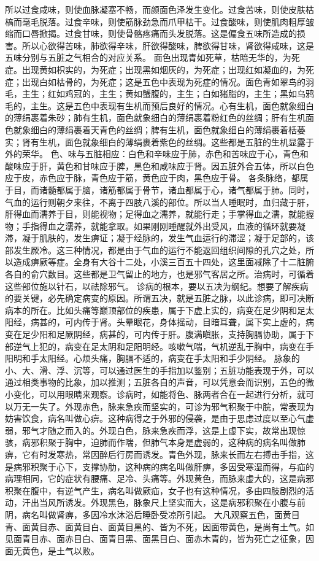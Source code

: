 \documentclass[a4paper,12pt,UTF8,twoside]{ctexbook}
\begin{document}
所以过食咸味，则使血脉凝塞不畅，而颜面色泽发生变化。过食苦味，则使皮肤枯槁而毫毛脱落。过食辛味，则使筋脉劲急而爪甲枯干。过食酸味，则使肌肉粗厚皱缩而口唇掀揭。过食甘味，则使骨骼疼痛而头发脱落。这是偏食五味所造成的损害。所以心欲得苦味，肺欲得辛味，肝欲得酸味，脾欲得甘味，肾欲得咸味，这是五味分别与五脏之气相合的对应关系。
面色出现青如死草，枯暗无华的，为死症。出现黄如枳实的，为死症；出现黑如烟灰的，为死症；出现红如凝血的，为死症；出现白如枯骨的，为死症；这是五色中表现为死症的情况。面色青如翠鸟的羽毛，主生；红如鸡冠的，主生；黄如蟹腹的，主生；白如猪脂的，主生；黑如乌鸦毛的，主生。这是五色中表现有生机而预后良好的情况。心有生机，面色就象细白的薄绢裹着朱砂；肺有生机，面色就象细白的薄绢裹着粉红色的丝绸；肝有生机面色就象细白的薄绢裹着天青色的丝绸；脾有生机，面色就象细白的薄绢裹着栝蒌实；肾有生机，面色就象细白的薄绢裹着紫色的丝绸。这些都是五脏的生机显露于外的荣华。
色、味与五脏相应：白色和辛味应于肺，赤色和苦味应于心，青色和酸味应于肝，黄色和甘味应于脾，黑色和咸味应于肾。因五脏外合五体，所以白色应于皮，赤色应于脉，青色应于筋，黄色应于肉，黑色应于骨。
各条脉络，都属于目，而诸髓都属于脑，诸筋都属于骨节，诸血都属于心，诸气都属于肺。同时，气血的运行则朝夕来往，不离于四肢八溪的部位。所以当人睡眠时，血归藏于肝，肝得血而濡养于目，则能视物；足得血之濡养，就能行走；手掌得血之濡，就能握物；手指得血之濡养，就能拿取。如果刚刚睡醒就外出受风，血液的循环就要凝滞，凝于肌肤的，发生痹证；凝于经脉的，发生气血运行的滞涩；凝于足部的，该部发生厥冷。这三种情况，都是由于气血的运行不能返回组织间隙的孔穴之处，所以造成痹厥等症。全身有大谷十二处，小溪三百五十四处，这里面减除了十二脏腑各自的俞穴数目。这些都是卫气留止的地方，也是邪气客居之所。治病时，可循着这些部位施以针石，以祛除邪气。
诊病的根本，要以五决为纲纪。想要了解疾病的要关键，必先确定病变的原因。所谓五决，就是五脏之脉，以此诊病，即可决断病本的所在。比如头痛等巅顶部位的疾患，属于下虚上实的，病变在足少阴和足太阳经，病甚的，可内传于肾。头晕眼花，身体摇动，目暗耳聋，属下实上虚的，病变在足少阳和足厥阴经，病甚的，可内传于肝。腹满瞋胀，支持胸膈协助，属于下部逆气上犯的，病变在足太阴和足阳明经。咳嗽气喘，气机逆乱于胸中，病变在手阳明和手太阳经。心烦头痛，胸膈不适的，病变在手太阳和手少阴经。
脉象的小、大、滑、浮、沉等，可以通过医生的手指加以鉴别；五脏功能表现于外，可以通过相类事物的比象，加以推测；五脏各自的声音，可以凭意会而识别，五色的微小变化，可以用眼睛来观察。诊病时，如能将色、脉两者合在一起进行分析，就可以万无一失了。外现赤色，脉来急疾而坚实的，可诊为邪气积聚于中脘，常表现为妨害饮食，病名叫做心痹。这种病得之于外邪的侵袭，是由于思虑过度以至心气虚弱，邪气才随之而入的。外现白色，脉来急疾而浮，这是上虚下实，故常出现惊骇，病邪积聚于胸中，迫肺而作喘，但肺气本身是虚弱的，这种病的病名叫做肺痹，它有时发寒热，常因醉后行房而诱发。青色外现，脉来长而左右搏击手指，这是病邪积聚于心下，支撑协肋，这种病的病名叫做肝痹，多因受寒湿而得，与疝的病理相同，它的症状有腰痛、足冷、头痛等。外现黄色，而脉来虚大的，这是病邪积聚在腹中，有逆气产生，病名叫做厥疝，女子也有这种情况，多由四肢剧烈的活动，汗出当风所诱发。外现黑色，脉象尺上坚实而大，这是病邪积聚在小腹与前阴，病名叫做肾痹，多因冷水沐浴后睡卧受凉所引起。
大凡观察五色，面黄目青、面黄目赤、面黄目白、面黄目黑的、皆为不死，因面带黄色，是尚有土气。如见面青目赤、面赤目白、面青目黑、面黑目白、面赤木青的，皆为死亡之征象，因面无黄色，是土气以败。
\end{document}
